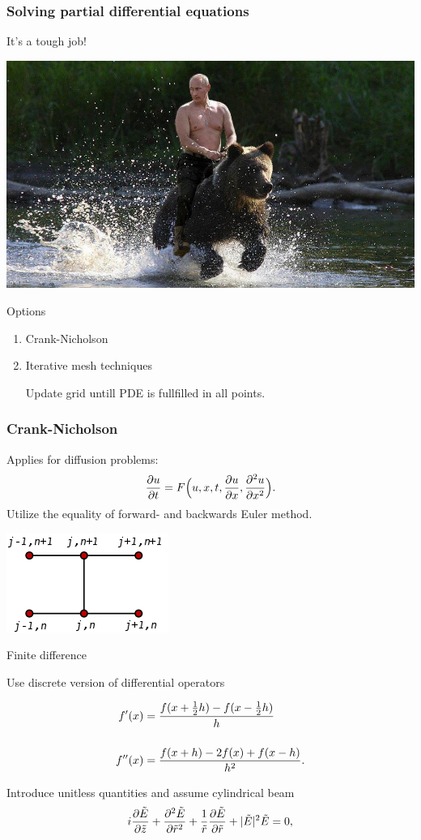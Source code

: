 \begin{frame}
  \frametitle{Solving partial differential equations}
  It's a tough job!

  \includegraphics[width=\columnwidth]{putin}
\end{frame}

\begin{frame}{Options}
\begin{enumerate}
\item Crank-Nicholson
\item Iterative mesh techniques

  Update grid untill PDE is fullfilled in all points. 
\end{enumerate}
\end{frame}


\begin{frame}
  \frametitle{Crank-Nicholson}
  Applies for diffusion problems:
  \[  \frac{\partial u}{\partial t} = F \Big(u, x, t, \frac{\partial u}{\partial x}, \frac{\partial^2 u}{\partial x^2} \Big). \]
  Utilize the equality of forward- and backwards Euler method.
  \begin{center}
    \includegraphics[width=0.4\columnwidth]{Crank}
  \end{center}
\end{frame}

\begin{frame}{Finite difference}

Use discrete version of differential operators

\begin{align*}
  f'(x) &= \frac{f(x+\frac{1}{2} h) - f(x - \frac{1}{2} h)}{h}\\[5mm]
  f''(x) &= \frac{f(x+h) - 2f(x) + f(x-h)}{h^{2}}.
\end{align*}

Introduce unitless quantities and assume cylindrical beam
\[   i \frac{\partial \tilde E}{\partial \tilde z} + \frac{\partial^2 \tilde E}{\partial \tilde r^2}
+ \frac{1}{\tilde r} \frac{\partial \tilde E}{\partial \tilde r}
+ |\tilde E|^2 \tilde E
= 0,\]
  
\end{frame}

